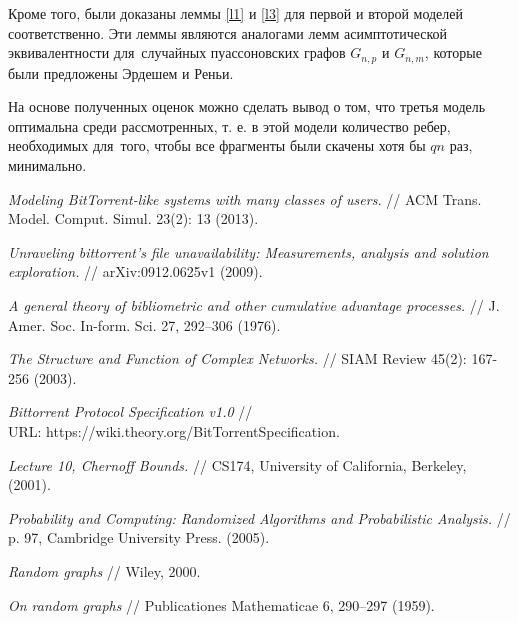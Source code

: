 \documentclass{matmex-diploma-custom}
\theoremstyle{named}
\begin{document}
Кроме того, были доказаны леммы \ref{l1} и \ref{l3} для первой и второй моделей соответственно. 
Эти леммы являются аналогами лемм асимптотической эквивалентности для~случайных пуассоновских графов $G_{n, p}$ и $G_{n, m}$, 
которые были предложены Эрдешем и Реньи. 

На основе полученных оценок можно сделать вывод о том, что третья модель оптимальна среди рассмотренных,
т. е. в этой модели количество ребер, необходимых для~того, чтобы все фрагменты были скачены хотя бы $qn$ раз, минимально.





\newpage

\begin{thebibliography}{XXXX}
	{%
			\renewcommand{\baselinestretch}{1.01}
			\selectfont
			
		{\em Modeling BitTorrent-like systems with many classes of users.}
		// ACM Trans. Model. Comput. Simul. 23(2): 13 (2013).
			
		{\em Unraveling bittorrent's file unavailability: Measurements, analysis and solution exploration.}
		// arXiv:0912.0625v1 (2009).
				
		{\em A general theory of bibliometric and other cumulative advantage processes.} 
		// J. Amer. Soc. In-form. Sci. 27, 292–306 (1976).
	
		{\em The Structure and Function of Complex Networks.}
		// SIAM Review 45(2): 167-256 (2003).

		{\em Bittorrent Protocol Specification v1.0} //
		\\ URL: https://wiki.theory.org/BitTorrentSpecification.
		
		{\em Lecture 10, Chernoff Bounds.}
		// CS174, University of California, Berkeley, (2001).
		
		{\em Probability and Computing: Randomized Algorithms and Probabilistic Analysis.}
		// p. 97, Cambridge University Press.  (2005).
		
		{\em Random graphs}
		// Wiley, 2000.
		
		{\em On random graphs}
		// Publicationes Mathematicae 6, 290–297 (1959).
		
	}%
\end{thebibliography}
	
\end{document}
